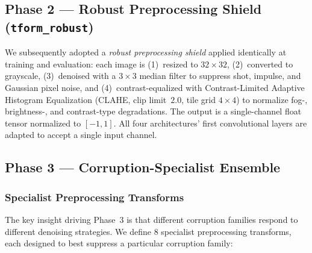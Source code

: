 \documentclass[conference]{IEEEtran}
\begin{document}
\subsection{Phase 2 — Robust Preprocessing Shield (\texttt{tform\_robust})}
\label{sec:phase2}
We subsequently adopted a \emph{robust preprocessing shield} applied identically at training and evaluation: each image is (1)~resized to $32{\times}32$, (2)~converted to grayscale, (3)~denoised with a $3{\times}3$ median filter to suppress shot, impulse, and Gaussian pixel noise, and (4)~contrast-equalized with Contrast-Limited Adaptive Histogram Equalization (CLAHE, clip limit~$2.0$, tile grid $4{\times}4$) to normalize fog-, brightness-, and contrast-type degradations. The output is a single-channel float tensor normalized to $[-1,1]$. All four architectures' first convolutional layers are adapted to accept a single input channel.

\subsection{Phase 3 — Corruption-Specialist Ensemble}
\label{sec:phase3}

\subsubsection{Specialist Preprocessing Transforms}
The key insight driving Phase~3 is that different corruption families respond to different denoising strategies. We define 8 specialist preprocessing transforms, each designed to best suppress a particular corruption family:
\end{document}
